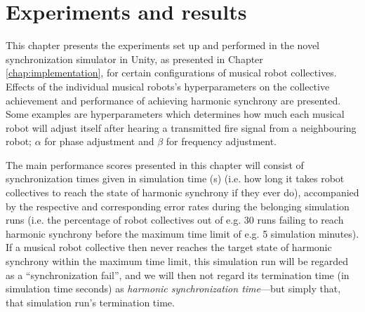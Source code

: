 \chapter{Experiments and results}
\label{chap:experiments_and_results}







This chapter presents the experiments set up and performed in the novel synchronization simulator in Unity, as presented in Chapter \ref{chap:implementation}, for certain configurations of musical robot collectives. Effects of the individual musical robots's hyperparameters on the collective achievement and performance of achieving harmonic synchrony are presented. Some examples are hyperparameters which determines how much each musical robot will adjust itself after hearing a transmitted fire signal from a neighbouring robot; $\alpha$ for phase adjustment and $\beta$ for frequency adjustment.

The main performance scores presented in this chapter will consist of synchronization times given in simulation time (s) (i.e. how long it takes robot collectives to reach the state of harmonic synchrony if they ever do), accompanied by the respective and corresponding error rates during the belonging simulation runs (i.e. the percentage of robot collectives out of e.g. 30 runs failing to reach harmonic synchrony before the maximum time limit of e.g. 5 simulation minutes). If a musical robot collective then never reaches the target state of harmonic synchrony within the maximum time limit, this simulation run will be regarded as a ``synchronization fail'', and we will then not regard its termination time (in simulation time seconds) as \textit{harmonic synchronization time}—but simply that, that simulation run's termination time.



